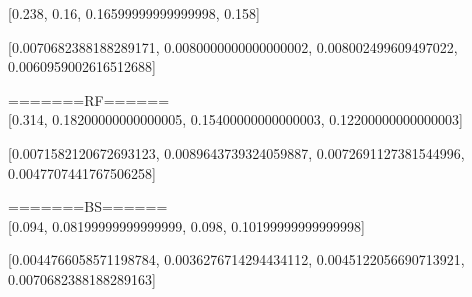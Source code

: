 \documentclass[12pt]{article}
\begin{document}
[0.238, 0.16, 0.16599999999999998, 0.158]

[0.0070682388188289171, 0.0080000000000000002, 0.008002499609497022, 0.0060959002616512688]

=======RF======\\

[0.314, 0.18200000000000005, 0.15400000000000003, 0.12200000000000003]

[0.0071582120672693123, 0.0089643739324059887, 0.0072691127381544996, 0.0047707441767506258]

=======BS======\\

[0.094, 0.08199999999999999, 0.098, 0.10199999999999998]

[0.0044766058571198784, 0.0036276714294434112, 0.0045122056690713921, 0.0070682388188289163]
\end{document}
